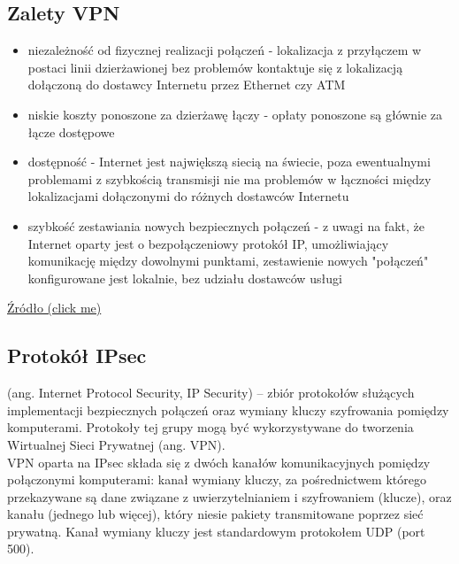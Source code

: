 \documentclass[main.tex]{subfiles}
\begin{document}
    \subsection{Zalety VPN}
    \begin{itemize}
        \item niezależność od fizycznej realizacji połączeń - lokalizacja z przyłączem w postaci linii dzierżawionej bez problemów kontaktuje się z lokalizacją dołączoną do dostawcy Internetu przez Ethernet czy ATM
        \item niskie koszty ponoszone za dzierżawę łączy - opłaty ponoszone są głównie za łącze dostępowe
        \item dostępność - Internet jest największą siecią na świecie, poza ewentualnymi problemami z szybkością transmisji nie ma problemów w łączności między lokalizacjami dołączonymi do różnych dostawców Internetu
        \item szybkość zestawiania nowych bezpiecznych połączeń - z uwagi na fakt, że Internet oparty jest o bezpołączeniowy protokół IP, umożliwiający komunikację między dowolnymi punktami, zestawienie nowych "połączeń" konfigurowane jest lokalnie, bez udziału dostawców usługi
    \end{itemize}

    \href{http://students.mimuw.edu.pl/SO/Projekt02-03/temat4-g1/Darek/VirtualPrivateNetwork.html}{Źródło (click me)}

    \subsection{Protokół IPsec}

    (ang. Internet Protocol Security, IP Security) – zbiór protokołów służących implementacji bezpiecznych połączeń oraz wymiany kluczy szyfrowania pomiędzy komputerami. Protokoły tej grupy mogą być wykorzystywane do tworzenia Wirtualnej Sieci Prywatnej (ang. VPN).\\

    VPN oparta na IPsec składa się z dwóch kanałów komunikacyjnych pomiędzy połączonymi komputerami: kanał wymiany kluczy, za pośrednictwem którego przekazywane są dane związane z uwierzytelnianiem i szyfrowaniem (klucze), oraz kanału (jednego lub więcej), który niesie pakiety transmitowane poprzez sieć prywatną. Kanał wymiany kluczy jest standardowym protokołem UDP (port 500).
\end{document}
